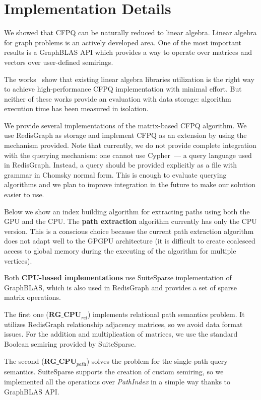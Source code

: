 \section{Implementation Details}

We showed that CFPQ can be naturally reduced to linear algebra.
Linear algebra for graph problems is an actively developed area.
One of the most important results is a GraphBLAS API which provides a way to operate over matrices and vectors over user-defined semirings.

The works~\cite{Mishin:2019:ECP:3327964.3328503, Azimov:2018:CPQ:3210259.3210264} show that existing linear algebra libraries utilization is the right way to achieve high-performance CFPQ implementation with minimal effort.
But neither of these works provide an evaluation with data storage: algorithm execution time has been measured in isolation.

We provide several implementations of the matrix-based CFPQ algorithm.
We use RedisGraph as storage and implement CFPQ as an extension by using the mechanism provided.
Note that currently, we do not provide complete integration with the querying mechanism: one cannot use Cypher~--- a query language used in RedisGraph.
Instead, a query should be provided explicitly as a file with grammar in Chomsky normal form.
This is enough to evaluate querying algorithms and we plan to improve integration in the future to make our solution easier to use. 

Below we show an index building algorithm for extracting paths using both the GPU and the CPU. The \textbf{path extraction} algorithm currently has only the CPU version. This is a conscious choice because the current path extraction algorithm does not adapt well to the GPGPU architecture (it is difficult to create coalesced access to global memory during the executing of the algorithm for multiple vertices).

Both \textbf{CPU-based implementations} use SuiteSparse implementation of GraphBLAS, which is also used in RedisGraph and provides a set of sparse matrix operations.

The first one ($\textbf{RG\_CPU}_{\textit{rel}}$) implements relational path semantics problem. It utilizes RedisGraph relationship adjacency matrices, so we avoid data format issues. For the addition and multiplication of matrices, we use the standard Boolean semiring provided by SuiteSparse.

The second ($\textbf{RG\_CPU}_{\textit{path}}$) solves the problem for the single-path query semantics. SuiteSparse supports the creation of custom semiring, so we implemented all the operations over \textit{PathIndex} in a simple way thanks to GraphBLAS API.


